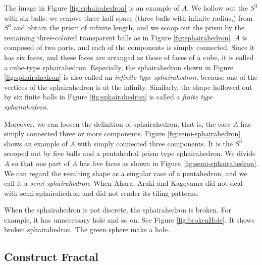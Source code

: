 \documentclass[dvipdfmx]{interact}
\theoremstyle{plain}%
\theoremstyle{definition}
\theoremstyle{remark}
\theoremstyle{problemstyle}
\begin{document}
The image in Figure \ref{fig:sphairahedron}
is an example of $A$.
We hollow out the $S^3$ with six balls: we remove three half space
(three balls with infinite radius,) from $S^3$ and obtain the prism of
infinite length, and we scoop out the prism by the remaining
three-colored transparent balls as in Figure
\ref{fig:sphairahedron}.
$A$ is composed of two parts, and each of the components is simply connected.
Since it has six faces, and these faces are arranged as those of faces of
a cube, it is called a cube-type sphairahedron.
Especially, the sphairahedron shown in Figure 
\ref{fig:sphairahedron}
is also called an \textit{infinite type sphairahedron},
because one of the vertices of the sphairahedron is at the infinity.
Similarly, the shape hollowed out by six finite balls in Figure
\ref{fig:sphairahedron} is called a
\textit{finite type sphairahedron}.

Moreover, we can loosen the definition of sphairahedron,
that is, the case $A$ has simply connected three or more components.
Figure \ref{fig:semi-sphairahedron} shows an
example of $A$ with simply connected three components.
It is the $S^3$ scooped out by five balls and a pentahedral prism type
sphairahedron.
We divide $A$ so that one part of $A$ has five faces as shown in
Figure \ref{fig:semi-sphairahedron}.
We can regard the resulting shape as a singular case of a pentahedron,
and we call it a \textit{semi-sphairahedron}.
When Ahara, Araki and Kageyama did not deal with semi-sphairahedron and
did not render its tiling patterns.

When the sphairahedron is not discrete, the sphairahedron is broken.
For example, it has unnecessary hole and so on.
See Figure \ref{fig:brokenHole}. It shows broken sphairahedron.
The green sphere make a hole.

\subsection{Construct Fractal}
\end{document}

